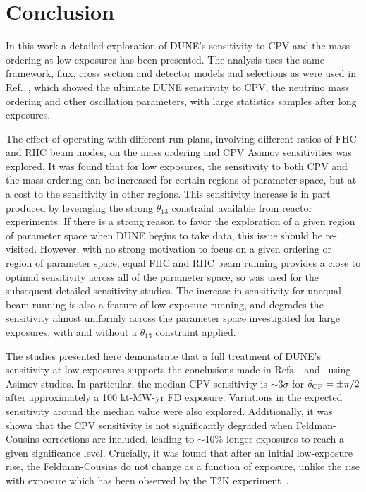 \section{Conclusion}
\label{sec:conclude}

In this work a detailed exploration of DUNE's sensitivity to CPV and the mass ordering at low exposures has been presented. The analysis uses the same framework, flux, cross section and detector models and selections as were used in Ref.~\cite{Abi:2020qib}, which showed the ultimate DUNE sensitivity to CPV, the neutrino mass ordering and other oscillation parameters, with large statistics samples after long exposures.

The effect of operating with different run plans, involving different ratios of FHC and RHC beam modes, on the mass ordering and CPV Asimov sensitivities was explored. It was found that for low exposures, the sensitivity to both CPV and the mass ordering can be increased for certain regions of parameter space, but at a cost to the sensitivity in other regions. This sensitivity increase is in part produced by leveraging the strong $\theta_{13}$ constraint available from reactor experiments. If there is a strong reason to favor the exploration of a given region of parameter space when DUNE begins to take data, this issue should be re-visited. However, with no strong motivation to focus on a given ordering or region of \deltacp parameter space, equal FHC and RHC beam running provides a close to optimal sensitivity across all of the parameter space, so was used for the subsequent detailed sensitivity studies. The increase in sensitivity for unequal beam running is also a feature of low exposure running, and degrades the sensitivity almost uniformly across the parameter space investigated for large exposures, with and without a $\theta_{13}$ constraint applied.

The studies presented here demonstrate that a full treatment of DUNE's sensitivity at low exposures supports the conclusions made in Refs.~\cite{Abi:2020qib} and~\cite{Abi:2020evt} using Asimov studies. In particular, the median CPV sensitivity is $\sim$3$\sigma$ for $\delta_{\rm CP} = \pm\pi/2$ after approximately a 100 kt-MW-yr FD exposure. Variations in the expected sensitivity around the median value were also explored. Additionally, it was shown that the CPV sensitivity is not significantly degraded when Feldman-Cousins corrections are included, leading to $\sim$10\% longer exposures to reach a given significance level. Crucially, it was found that after an initial low-exposure rise, the Feldman-Cousins \dchisqcrit do not change as a function of exposure, unlike the rise with exposure which has been observed by the T2K experiment~\cite{Abe:2021gky}.

